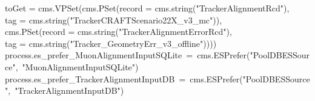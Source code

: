 \documentclass[compress]{beamer}
\begin{document}
\begin{frame}
\hspace{1.5 cm}toGet = cms.VPSet(cms.PSet(record = cms.string("TrackerAlignmentRcd"), \\
\hspace{2.5 cm}tag = cms.string("TrackerCRAFTScenario22X\_v3\_mc")), \\
\hspace{2 cm}cms.PSet(record = cms.string("TrackerAlignmentErrorRcd"), \\
\hspace{2.5 cm}tag = cms.string("Tracker\_GeometryErr\_v3\_offline")))) \\
\mbox{process.es\_prefer\_MuonAlignmentInputSQLite = cms.ESPrefer("PoolDBESSource", "MuonAlignmentInputSQLite")\hspace{-2 cm}} \\
\mbox{process.es\_prefer\_TrackerAlignmentInputDB = cms.ESPrefer("PoolDBESSource", "TrackerAlignmentInputDB")\hspace{-2 cm}}
\end{frame}
\end{document}
